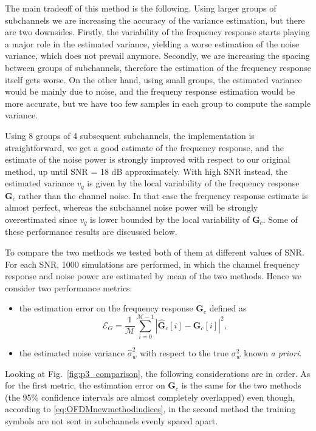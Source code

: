 \documentclass[10pt]{article}
\newcommand{\ofdM} {\mathcal{M}}
\begin{document}
The main tradeoff of this method is the following. Using larger groups of subchannels we are increasing the accuracy of the variance estimation, but there are two downsides. Firstly, the variability of the frequency response starts playing a major role in the estimated variance, yielding a worse estimation of the noise variance, which does not prevail anymore. Secondly, we are increasing the spacing between groups of subchannels, therefore the estimation of the frequency response itself gets worse. On the other hand, using small groups, the estimated variance would be mainly due to noise, and the frequeny response estimation would be more accurate, but we have too few samples in each group to compute the sample variance.

Using 8 groups of 4 subsequent subchannels, the implementation is straightforward, we get a good estimate of the frequency response, and the estimate of the noise power is strongly improved with respect to our original method, up until SNR = 18 dB approximately. With high SNR instead, the estimated variance $v_q$ is given by the local variability of the frequency response $\mathbf{G}_c$ rather than the channel noise. In that case the frequency response estimate is almost perfect, whereas the subchannel noise power will be strongly overestimated since $v_q$ is lower bounded by the local variability of $\mathbf{G}_c$. Some of these performance results are discussed below.

To compare the two methods we tested both of them at different values of SNR. For each SNR, 1000 simulations are performed, in which the channel frequency response and noise power are estimated by mean of the two methods. Hence we consider two performance metrics:
\begin{itemize}
	\item the estimation error on the frequency response $\mathbf{G}_c$ defined as
		\begin{equation}
			\mathcal{E}_G = \dfrac{1}{\ofdM} \sum_{i=0}^{\ofdM - 1} \left| \mathbf{\hat{G}}_c [i] - \mathbf{G}_c [i] \right|^2,
		\end{equation}
	\item the estimated noise variance $\hat{\sigma}_w^2$ with respect to the true $\sigma_w^2$ known \textit{a priori}.
\end{itemize}

Looking at Fig.~\ref{fig:p3_comparison}, the following considerations are in order. As for the first metric, the estimation error on $\mathbf{G}_c$ is the same for the two methods (the 95\% confidence intervals are almost completely overlapped) even though, according to \eqref{eq:OFDMnewmethodindices}, in the second method the training symbols are not sent in subchannels evenly spaced apart.
\end{document}
